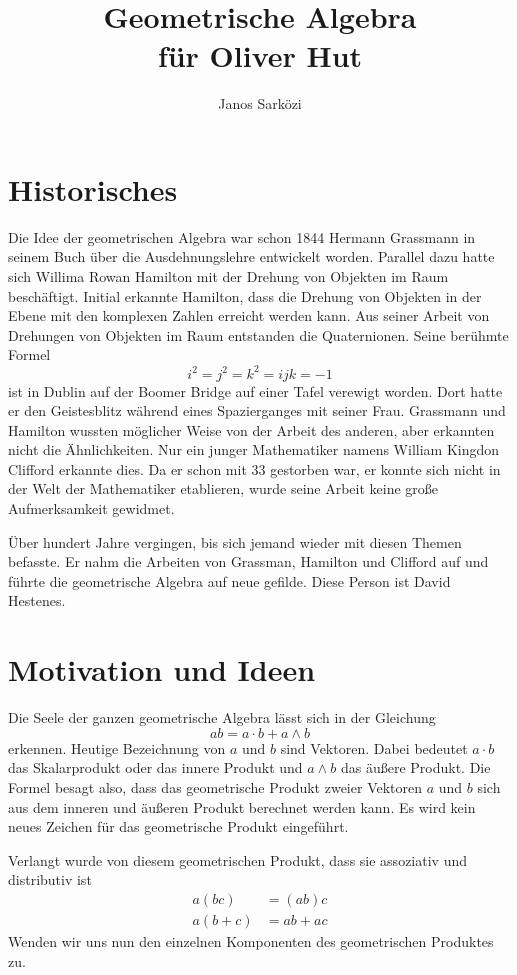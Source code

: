 \documentclass[fleqn]{scrartcl}
\title{Geometrische Algebra \\
für Oliver Hut}
\author{Janos Sarközi}
\numberwithin{equation}{section}
\begin{document}
\maketitle
\newpage
\section{Historisches}
Die Idee der geometrischen Algebra war schon 1844 Hermann Grassmann in seinem
Buch über die Ausdehnungslehre entwickelt worden. Parallel dazu hatte sich
Willima Rowan Hamilton mit der Drehung von Objekten im Raum beschäftigt.
Initial erkannte Hamilton, dass die Drehung von Objekten in der Ebene mit den
komplexen Zahlen erreicht werden kann. Aus seiner Arbeit von Drehungen von
Objekten im Raum entstanden die Quaternionen. Seine berühmte Formel
\[i^2=j^2=k^2=ijk=-1\]
ist in Dublin auf der Boomer Bridge auf einer Tafel verewigt worden. Dort
hatte er den Geistesblitz während eines Spazierganges mit seiner Frau.
Grassmann und Hamilton wussten möglicher Weise von der Arbeit des anderen,
aber erkannten nicht die Ähnlichkeiten. Nur ein junger Mathematiker namens
William Kingdon Clifford erkannte dies. Da er schon mit 33 gestorben war,
er konnte sich nicht in der Welt der Mathematiker etablieren, wurde seine
Arbeit keine große Aufmerksamkeit gewidmet.

Über hundert Jahre vergingen, bis sich jemand wieder mit diesen Themen
befasste. Er nahm die Arbeiten von Grassman, Hamilton und Clifford auf und
führte die geometrische Algebra auf neue gefilde. Diese Person ist David
Hestenes.

\section{Motivation und Ideen}
Die Seele der ganzen geometrische Algebra lässt sich in der
Gleichung
\[ab = a\cdot b + a\wedge b\]
erkennen. Heutige Bezeichnung von $a$ und $b$ sind Vektoren. Dabei bedeutet
$a\cdot b$ das Skalarprodukt oder das innere Produkt und $a\wedge b$ das
äußere Produkt. Die Formel besagt also, dass das geometrische Produkt zweier
Vektoren $a$ und $b$ sich aus dem inneren und äußeren Produkt berechnet
werden kann. Es wird kein neues Zeichen für das geometrische Produkt
eingeführt.

Verlangt wurde von diesem geometrischen Produkt, dass sie assoziativ und 
distributiv ist
\begin{align*}
    a(bc) &= (ab)c \\
    a(b+c) &= ab + ac
\end{align*}
Wenden wir uns nun den einzelnen Komponenten des geometrischen Produktes zu.
\newpage
\end{document}

